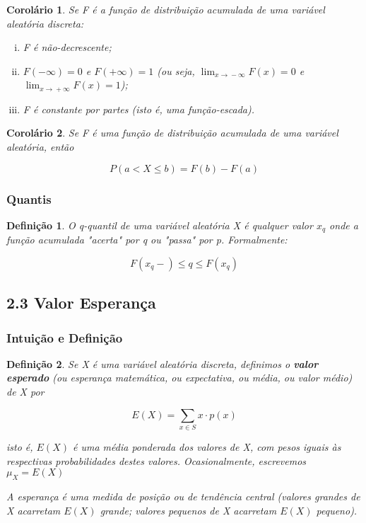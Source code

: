 \documentclass[12pt]{article}
\newtheorem{corollary}{Corolário}[theorem]
\newtheorem{definition}{Definição}
\begin{document}
\begin{corollary}
Se F é a função de distribuição acumulada de uma variável aleatória discreta:

\begin{enumerate}[i.]
    \item F é não-decrescente;
    \item $F(- \infty) = 0$ e $F(+ \infty) = 1$ (ou seja, $\lim_{x\rightarrow{} - \infty} F(x) = 0$ e $\lim_{x\rightarrow{} + \infty} F(x) = 1$);
    \item F é constante por partes (isto é, uma função-escada).
\end{enumerate}
\end{corollary}

\begin{corollary}
Se F é uma função de distribuição acumulada de uma variável aleatória, então

$$P(a < X \leq b) = F(b) - F(a)$$
\end{corollary}

\subsubsection*{Quantis}
\begin{definition}
O q-quantil de uma variável aleatória X é qualquer valor $x_q$ onde a função acumulada "acerta" por q ou "passa" por p. Formalmente:

$$F(x_q -) \leq q \leq F(x_q)$$
\end{definition}

\subsection*{2.3 Valor Esperança}
\label{s7}

\subsubsection*{Intuição e Definição}
\begin{definition}
Se X é uma variável aleatória discreta, definimos o \textbf{valor esperado} (ou esperança matemática, ou expectativa, ou média, ou valor médio) de X por

$$E(X) = \sum_{x \in S} x \cdot p(x)$$

isto é, $E(X)$ é uma média ponderada dos valores de X, com pesos iguais às respectivas probabilidades destes valores. Ocasionalmente, escrevemos $\mu_X = E(X)$

A esperança é uma medida de posição ou de tendência central (valores grandes de X acarretam $E(X)$ grande; valores pequenos de X acarretam $E(X)$ pequeno).
\end{definition}
\end{document}

